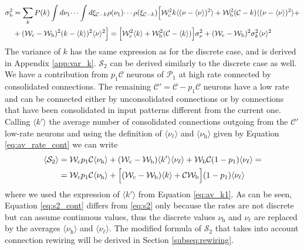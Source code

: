\documentclass[a4paper, 12pt, twoside, openright]{book}
\newcommand{\popI}{\mathcal{P}_1}
\newcommand{\rh}{\nu_\text{h}}
\newcommand{\rl}{\nu_{\ell}}
\newcommand{\C}{\mathcal{C}}
\newcommand{\Wb}{\mathcal{W}_\text{b}}
\newcommand{\Wc}{\mathcal{W}_\text{c}}
\newcommand{\SII}{\mathcal{S}_\text{2}}
\newcommand{\varSb}{\sigma^{2}_\text{b}}
\begin{document}
\begin{equation}
\label{eq:var_sb2_cont}
\begin{split}
    \varSb &= \sum_k P(k) \int d\nu_1 \dotsi \int d\xi_{\C-k} \rho(\nu_1) \dotsi \rho(\xi_{\C-k}) \Bigl[ \Wc^2 k \langle (\nu - \langle \nu \rangle)^2 \rangle + \Wb^2 (\C - k) \langle (\nu - \langle \nu \rangle)^2 \rangle +\\
    & + (\Wc - \Wb)^2 (k - \langle k \rangle)^2 \langle \nu \rangle ^2 \Bigr] = \Bigl[ \Wc^2 \langle k \rangle + \Wb^2 (\C - \langle k \rangle)\Bigr] \sigma_{\nu}^2 + (\Wc - \Wb)^2 \sigma_{k}^2 \langle \nu \rangle ^2
\end{split}
\end{equation}
The variance of $k$ has the same expression as for the discrete case, and is derived in  Appendix \ref{app:var_k}.
$\SII$ can be derived similarly to the discrete case as well.
We have a contribution from $p_1\C$ neurons of $\popI$ at high rate connected by consolidated connections.
The remaining $\C'= \C - p_1\C$ neurons have a low rate
and can be connected either by unconsolidated connections or by connections that have been consolidated in input patterns different from the current one.
Calling $\langle k' \rangle$ the average number of 
consolidated connections outgoing from the $\C'$ low-rate neurons and using the definition of $\langle \rl \rangle$ and $\langle \rh \rangle$ given by Equation \eqref{eq:av_rate_cont} we can write
\begin{equation}
\label{eq:s2_cont}
\begin{split}
    \langle \SII \rangle &= \Wc p_1 \C \langle \rh \rangle + (\Wc - \Wb) \langle k' \rangle \langle \rl \rangle + \Wb \C(1-p_1)\langle \rl \rangle =\\
    &= \Wc p_1 \C \langle \rh \rangle + \Bigl[ (\Wc - \Wb) \langle k \rangle + \C \Wb \Bigr] (1-p_1) \langle \rl \rangle
\end{split}
\end{equation}
where we used the expression of $\langle k' \rangle$
from Equation \eqref{eq:av_k1}.
As can be seen, Equation \eqref{eq:s2_cont} differs from \eqref{eq:s2} only because the rates are not discrete but can assume continuous values, thus the discrete values
$\rh$ and $\rl$ are replaced by the averages
$\langle \rh \rangle$ and $\langle \rl \rangle$.
The modified formula of $\SII$ that takes into account
connection rewiring will be derived in Section \ref{subseq:rewiring}.
\end{document}

